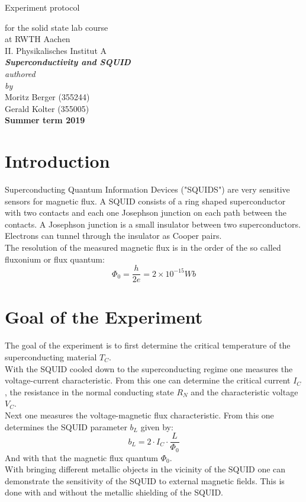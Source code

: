 \documentclass[12pt,a4paper]{article}
\author{Gerald}
\begin{document}
	\setlength{\parindent}{0pt} 
	\begin{center}
		{\LARGE Experiment protocol}\\
		\begin{large}
			for the solid state lab course\\[0.4cm]
			at RWTH Aachen\\
			II. Physikalisches Institut A\\[5.5cm]
			\Large\textbf{\textsl{Superconductivity and SQUID}}\\[5.5cm]
			\normalsize\textit{authored\\by}\\[0.4cm]
			\large{Moritz Berger (355244)\\Gerald Kolter (355005)}\\[2cm]
			\large \textbf{Summer term 2019}
		\end{large}
	\end{center}
	\newpage
	
	\tableofcontents
	\newpage

\section{Introduction}
Superconducting Quantum Information Devices ("SQUIDS") are very sensitive sensors for magnetic flux. A SQUID consists of a ring shaped superconductor with two contacts and each one Josephson junction on each path between the contacts. A Josephson junction is a small insulator between two superconductors. Electrons can tunnel through the insulator as Cooper pairs. \\
The resolution of the measured magnetic flux is in the order of the so called fluxonium or flux quantum:
\begin{equation*}
\Phi _0 = \dfrac{h}{2e} = 2 \times 10^{-15}\si{Wb}
\end{equation*}


\section{Goal of the Experiment}
The goal of the experiment is to first determine the critical temperature of the superconducting material $T_C$. \\
With the SQUID cooled down to the superconducting regime one measures the voltage-current characteristic. From this one can determine the critical current $I_C$, the resistance in the normal conducting state $R_N$ and the characteristic voltage $V_C$. \\
Next one measures the voltage-magnetic flux characteristic. From this one determines the SQUID parameter $b_L$ given by:
\begin{equation}
b_L = 2 \cdot I_C \cdot \dfrac{L}{\Phi _0}
\end{equation}
And with that the magnetic flux quantum $\Phi _0$. \\
With bringing different metallic objects in the vicinity of the SQUID one can demonstrate the sensitivity of the SQUID to external magnetic fields. This is done with and without the metallic shielding of the SQUID.
\end{document}
